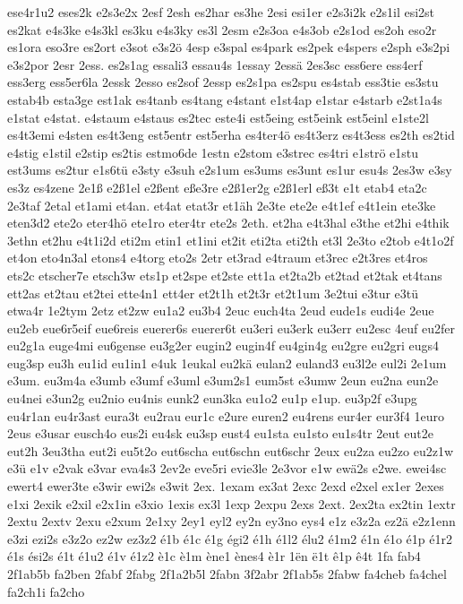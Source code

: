 {ese4r1u2
eses2k
e2s3e2x
2esf
2esh
es2har
es3he
2esi
esi1er
e2s3i2k
e2s1il
esi2st
es2kat
e4s3ke
e4s3kl
es3ku
e4s3ky
es3l
2esm
e2s3oa
e4s3ob
e2s1od
es2oh
eso2r
es1ora
eso3re
es2ort
e3sot
e3s2ö
4esp
e3spal
es4park
es2pek
e4spers
e2sph
e3s2pi
e3s2por
2esr
2ess.
es2s1ag
essali3
essau4s
1essay
2essä
2es3sc
ess6ere
ess4erf
ess3erg
ess5er6la
2essk
2esso
es2sof
2essp
es2s1pa
es2spu
es4stab
ess3tie
es3stu
estab4b
esta3ge
est1ak
es4tanb
es4tang
e4stant
e1st4ap
e1star
e4starb
e2st1a4s
e1stat
e4stat.
e4staum
e4staus
es2tec
este4i
est5eing
est5eink
est5einl
e1ste2l
es4t3emi
e4sten
es4t3eng
est5entr
est5erha
es4ter4ö
es4t3erz
es4t3ess
es2th
es2tid
e4stig
e1stil
e2stip
es2tis
estmo6de
1estn
e2stom
e3strec
es4tri
e1strö
e1stu
est3ums
es2tur
e1s6tü
e3sty
e3suh
e2s1um
es3ums
es3unt
es1ur
esu4s
2es3w
e3sy
es3z
es4zene
2e1ß
e2ß1el
e2ßent
eße3re
e2ß1er2g
e2ß1erl
eß3t
e1t
etab4
eta2c
2e3taf
2etal
et1ami
et4an.
et4at
etat3r
et1äh
2e3te
ete2e
e4t1ef
e4t1ein
ete3ke
eten3d2
ete2o
eter4hö
ete1ro
eter4tr
ete2s
2eth.
et2ha
e4t3hal
e3the
et2hi
e4thik
3ethn
et2hu
e4t1i2d
eti2m
etin1
et1ini
et2it
eti2ta
eti2th
et3l
2e3to
e2tob
e4t1o2f
et4on
eto4n3al
etons4
e4torg
eto2s
2etr
et3rad
e4traum
et3rec
e2t3res
et4ros
ets2c
etscher7e
etsch3w
ets1p
et2spe
et2ste
ett1a
et2ta2b
et2tad
et2tak
et4tans
ett2as
et2tau
et2tei
ette4n1
ett4er
et2t1h
et2t3r
et2t1um
3e2tui
e3tur
e3tü
etwa4r
1e2tym
2etz
et2zw
eu1a2
eu3b4
2euc
euch4ta
2eud
eude1s
eudi4e
2eue
eu2eb
eue6r5eif
eue6reis
euerer6s
euerer6t
eu3eri
eu3erk
eu3err
eu2esc
4euf
eu2fer
eu2g1a
euge4mi
eu6gense
eu3g2er
eugin2
eugin4f
eu4gin4g
eu2gre
eu2gri
eugs4
eug3sp
eu3h
eu1id
eu1in1
e4uk
1eukal
eu2kä
eulan2
euland3
eu3l2e
eul2i
2e1um
e3um.
eu3m4a
e3umb
e3umf
e3uml
e3um2s1
eum5st
e3umw
2eun
eu2na
eun2e
eu4nei
e3un2g
eu2nio
eu4nis
eunk2
eun3ka
eu1o2
eu1p
e1up.
eu3p2f
e3upg
eu4r1an
eu4r3ast
eura3t
eu2rau
eur1c
e2ure
euren2
eu4rens
eur4er
eur3f4
1euro
2eus
e3usar
eusch4o
eus2i
eu4sk
eu3sp
eust4
eu1sta
eu1sto
eu1s4tr
2eut
eut2e
eut2h
3eu3tha
eut2i
eu5t2o
eut6scha
eut6schn
eut6schr
2eux
eu2za
eu2zo
eu2z1w
e3ü
e1v
e2vak
e3var
eva4s3
2ev2e
eve5ri
evie3le
2e3vor
e1w
ewä2s
e2we.
ewei4sc
ewert4
ewer3te
e3wir
ewi2s
e3wit
2ex.
1exam
ex3at
2exc
2exd
e2xel
ex1er
2exes
e1xi
2exik
e2xil
e2x1in
e3xio
1exis
ex3l
1exp
2expu
2exs
2ext.
2ex2ta
ex2tin
1extr
2extu
2extv
2exu
e2xum
2e1xy
2ey1
eyl2
ey2n
ey3no
eys4
e1z
e3z2a
ez2ä
e2z1enn
e3zi
ezi2s
e3z2o
ez2w
ez3z2
é1b
é1c
é1g
égi2
é1h
é1l2
élu2
é1m2
é1n
é1o
é1p
é1r2
é1s
ési2s
é1t
é1u2
é1v
é1z2
è1c
è1m
ène1
ènes4
è1r
1ën
ë1t
ê1p
ê4t
1fa
fab4
2f1ab5b
fa2ben
2fabf
2fabg
2f1a2b5l
2fabn
3f2abr
2f1ab5s
2fabw
fa4cheb
fa4chel
fa2ch1i
fa2cho
}
